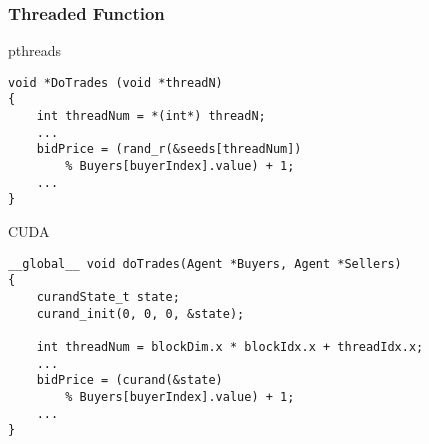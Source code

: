 \documentclass{beamer}
\begin{document}
\begin{frame}[fragile]
  \frametitle{Threaded Function}
  pthreads
\begin{lstlisting}[frame=single]
void *DoTrades (void *threadN)
{
    int threadNum = *(int*) threadN;
    ...
    bidPrice = (rand_r(&seeds[threadNum])
        % Buyers[buyerIndex].value) + 1;
    ...
}
\end{lstlisting}

  CUDA
\begin{lstlisting}[frame=single]
__global__ void doTrades(Agent *Buyers, Agent *Sellers)
{
    curandState_t state;
    curand_init(0, 0, 0, &state);

    int threadNum = blockDim.x * blockIdx.x + threadIdx.x;
    ...
    bidPrice = (curand(&state)
        % Buyers[buyerIndex].value) + 1;
    ...
}
\end{lstlisting}
\end{frame}
\end{document}
